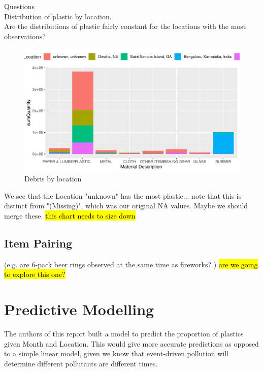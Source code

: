 \documentclass[10pt]{article}\usepackage[]{graphicx}\usepackage[]{color}
\newenvironment{knitrout}{}{} %
\begin{document}
Questions\\
Distribution of plastic by location.\\
Are the distributions of plastic fairly constant for the locations with the most observations?\\
\begin{figure}[H] %
\begin{center}
\begin{knitrout}
\color{fgcolor}
\includegraphics[width=1\linewidth]{figure/unnamed-chunk-16-1} 

\end{knitrout}
\caption {Debris by location}
\label{figG}
\end {center}
\end {figure}
We see that the Location "unknown" has the most plastic... note that this is distinct from "(Missing)", which was our original NA values. Maybe we should merge these.
\hl{this chart needs to size down}



\subsection{Item Pairing} 
(e.g. are 6-pack beer rings observed at the same time as fireworks? )
\hl{are we going to explore this one?}

\pagebreak
\section{Predictive Modelling}
The authors of this report built a model to predict the proportion of plastics given Month and Location. This would give more accurate predictions as opposed to a simple linear model, given we know that event-driven pollution will determine different pollutants are different times.
\end{document}
